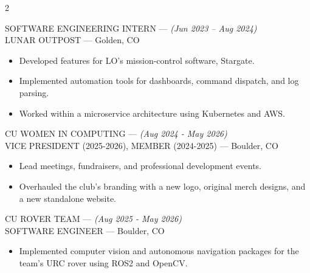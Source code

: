 \documentclass[10pt,letterpaper,ragged2e,withhyper]{altacv}
\newcommand{\experience}[4]{
  \textcolor{subheading}{\MakeUppercase{#1}} \hspace{0.2cm}--- \hspace{0.2cm} \emph{(#2)}\\
  {\MakeUppercase{#3}} \hspace{0.2cm}---\hspace{0.2cm}   #4
  \vspace{4pt}  %
}
\begin{document}
\begin{paracol}{2}
\divider

\experience
  {Software Engineering Intern}
  {Jun 2023 – Aug 2024}
  {Lunar Outpost}
  {Golden, CO}
\begin{itemize}
  \item Developed features for LO's mission-control software, Stargate.
  \item Implemented automation tools for dashboards, command dispatch, and log parsing.
  \item Worked within a microservice architecture using Kubernetes and AWS.
\end{itemize}

\vspace{0.8em}

\experience
  {CU Women in Computing}
  {Aug 2024 - May 2026}
  {Vice President (2025-2026), Member (2024-2025)}
  {Boulder, CO}
\begin{itemize}
  \item Lead meetings, fundraisers, and professional development events.
  \item Overhauled the club's branding with a new logo, original merch designs, and a new standalone website.
\end{itemize}

\divider

\experience
  {CU Rover Team}
  {Aug 2025 - May 2026}
  {Software Engineer}
  {Boulder, CO}
\begin{itemize}
  \item Implemented computer vision and autonomous navigation packages for the team's URC rover using ROS2 and OpenCV.
\end{itemize}

\end{paracol}
\end{document}
